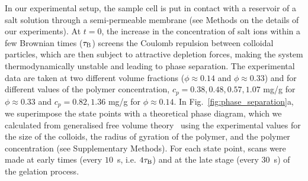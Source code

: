 \documentclass[preprint,amsmath,amssymb,superscriptaddress]{revtex4-1}
\begin{document}
In our experimental setup, the sample cell is put in contact with a reservoir of a salt solution through a semi-permeable membrane (see Methods 
on the details of our experiments).
At $t=0$, the increase in the concentration of salt ions within a few Brownian times ($\tau_{\rm B}$) screens the Coulomb repulsion between colloidal particles,
which are then subject to attractive depletion forces, making the system thermodynamically unstable and leading to phase separation. 
The experimental data are taken at two different volume fractions ($\phi\approx 0.14$ and $\phi\approx 0.33$) and for different values
of the polymer concentration, $c_p=0.38,0.48,0.57,1.07$ mg/g for $\phi\approx 0.33$ and $c_p=0.82,1.36$ mg/g for $\phi\approx 0.14$.
In Fig.~\ref{fig:phase_separation}a, we superimpose the state points with a theoretical phase diagram, which we calculated from generalised free volume theory~\cite{Fleer2008} using the experimental values for the size of the colloids, the radius of gyration of the polymer, and the polymer concentration (see Supplementary Methods).
For each state point, scans were made at early times (every $10$~s, i.e. $4\tau_{\rm B}$) and at the late stage (every $30$~s) of the gelation process. 
\end{document}
